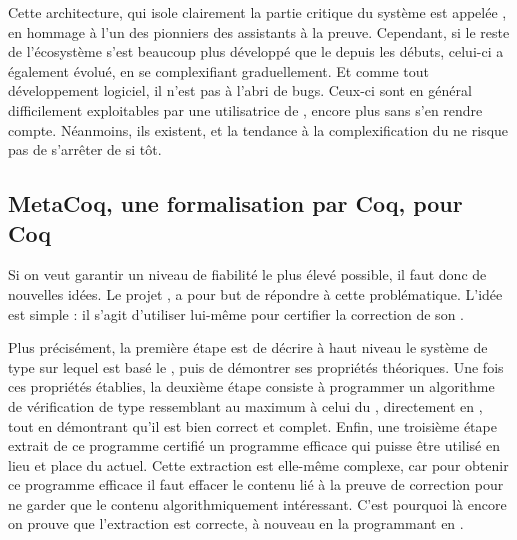 Cette architecture, qui isole clairement la partie critique du système
est appelée  , en 
hommage à l’un des pionniers des assistants à la preuve.
Cependant, si le reste de l’écosystème s’est beaucoup plus développé que le  depuis les débuts, celui-ci a également évolué, en se complexifiant graduellement.
Et comme tout développement logiciel, il n’est pas à l’abri de bugs.
Ceux-ci sont en général difficilement exploitables par une utilisatrice de , encore plus sans s’en rendre compte.
Néanmoins, ils existent, et la tendance à la complexification du  ne risque pas de s’arrêter de si tôt.

\subsection{MetaCoq, une formalisation par Coq, pour Coq}
\label{sec:intro-metacoq}


Si on veut garantir un niveau de fiabilité le plus élevé possible, il faut donc de nouvelles idées.
Le projet , a pour but de répondre à cette problématique.
L’idée est simple : il s’agit d’utiliser  lui-même pour certifier la correction de son .

Plus précisément, la première étape est de décrire à haut niveau le système de type sur lequel est basé le , puis de démontrer ses propriétés théoriques.
Une fois ces propriétés établies, la deuxième étape consiste à programmer un algorithme de vérification de type ressemblant au maximum à celui du , directement en ,
tout en démontrant qu’il est bien correct
et complet.
Enfin, une troisième étape extrait de ce programme  certifié
un programme efficace qui puisse être utilisé en lieu et place du  actuel.
Cette extraction est elle-même complexe, car pour obtenir ce programme efficace il
faut effacer le contenu lié à la preuve de correction
pour ne garder que le contenu algorithmiquement intéressant.
C’est pourquoi là encore on prouve que l’extraction est correcte,
à nouveau en la programmant en .


